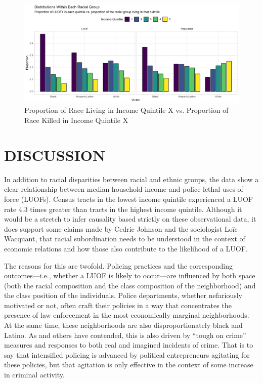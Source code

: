 \documentclass[12pt]{article}
\begin{document}
\begin{figure}[H]
  \centering
  \includegraphics[width=\linewidth]{images/inc_and_race_victim_shape_bar}
  \captionsetup{justification=centering, singlelinecheck=false, margin=2cm}
  \caption{Proportion of Race Living in Income Quintile X vs. Proportion of Race Killed in Income Quintile X}
  \label{fig:inc_and_race_victim_shape_bar} 
\end{figure}

\section{DISCUSSION}

In addition to racial disparities between racial and ethnic groups, the data show a clear relationship between median household income and police lethal uses of force (LUOFs). Census tracts in the lowest income quintile experienced a LUOF rate 4.3 times greater than tracts in the highest income quintile. Although it would be a stretch to infer causality based strictly on these observational data, it does support some claims made by Cedric Johnson and the sociologist Loïc Wacquant, that racial subordination needs to be understood in the context of economic relations and how those also contribute to the likelihood of a LUOF.

The reasons for this are twofold. Policing practices and the corresponding outcomes—i.e., whether a LUOF is likely to occur—are influenced by both space (both the racial composition and the class composition of the neighborhood) and the class position of the individuals. Police departments, whether nefariously motivated or not, often craft their policies in a way that concentrates the presence of law enforcement in the most economically marginal neighborhoods. At the same time, these neighborhoods are also disproportionately black and Latino. As \textcite{sossPoliceAreOur2017} and others have contended, this is also driven by “tough on crime” measures and responses to both real and imagined incidents of crime. That is to say that intensified policing is advanced by political entrepreneurs agitating for these policies, but that agitation is only effective in the context of some increase in criminal activity.
\end{document}
